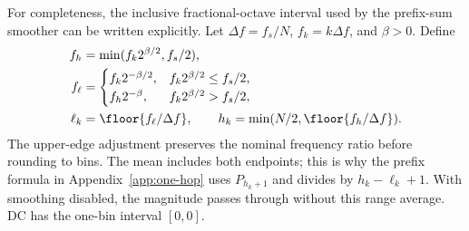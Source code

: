For completeness, the inclusive fractional-octave interval used by the
prefix-sum smoother can be written explicitly. Let $\Delta f=f_s/N$,
$f_k=k\Delta f$, and $\beta>0$. Define
\begin{align}
 f_h&=\min(f_k2^{\beta/2},f_s/2),\\
 f_\ell&=\begin{cases}
 f_k2^{-\beta/2},&f_k2^{\beta/2}\le f_s/2,\\
 f_h2^{-\beta},&f_k2^{\beta/2}>f_s/2,
 \end{cases}\\
 \ell_k&=\floor{f_\ell/\Delta f},\qquad
 h_k=\min(N/2,\floor{f_h/\Delta f}).
 \label{eq:octave-bounds}
\end{align}
The upper-edge adjustment preserves the nominal frequency ratio before
rounding to bins. The mean includes both endpoints; this is why the prefix
formula in Appendix~\ref{app:one-hop} uses $P_{h_k+1}$ and divides by
$h_k-\ell_k+1$. With smoothing disabled, the magnitude passes through
without this range average. DC has the one-bin interval $[0,0]$.

